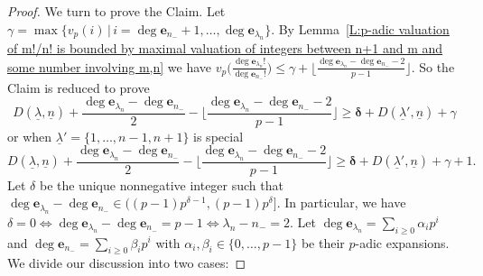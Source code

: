 \documentclass[12pt]{amsart}
\theoremstyle{definition}
\numberwithin{equation}{subsection}
\def\bfe{\mathbf{e}}
\begin{document}
\begin{proof}
We turn to prove the Claim.
Let $\gamma=\max\{v_p(i)\,|\,i=\deg \bfe_{n_-}+1,\dots, \deg \bfe_{\lambda_n} \}$. By Lemma~\ref{L:p-adic valuation of m!/n! is bounded by maximal valuation of integers between n+1 and m and some number involving m,n} we have $v_p\big(\frac{\deg \bfe_{\lambda_n}!}{\deg \bfe_{n_-}!} \big)\leq \gamma+\lfloor \frac {\deg \bfe_{\lambda_n}-\deg \bfe_{n_-}-2}{p-1} \rfloor$. So the Claim is reduced to prove
	\begin{equation}
	\label{E:lambda to lambda'}
	D(\underline \lambda, \underline n) + \frac{\deg \bfe_{\lambda_n} - \deg \bfe_{n_-}}2 - \Big\lfloor \frac{\deg \bfe_{\lambda_n}-\deg \bfe_{n_-}-2}{p-1}\Big\rfloor \geq \boldsymbol{\delta} + D(\underline \lambda', \underline n) + \gamma
	\end{equation}
    or when $\underline\lambda'=\{1,\dots, n-1,n+1\}$ is special
    \begin{equation}
	\label{E:lambda to lambda' in the special case}
	D(\underline \lambda, \underline n) + \frac{\deg \bfe_{\lambda_n} - \deg \bfe_{n_-}}2 - \Big\lfloor \frac{\deg \bfe_{\lambda_n}-\deg \bfe_{n_-}-2}{p-1}\Big\rfloor \geq \boldsymbol{\delta} + D(\underline \lambda', \underline n) + \gamma+1.
	\end{equation}
Let $\delta$ be the unique nonnegative integer such that $\deg \bfe_{\lambda_n}-\deg \bfe_{n_-}\in ((p-1)p^{\delta-1},(p-1)p^\delta]$. In particular, we have $\delta=0\Leftrightarrow \deg \bfe_{\lambda_n}-\deg \bfe_{n_-}=p-1\Leftrightarrow \lambda_n-n_-=2$. Let $\deg\bfe_{\lambda_n}=\sum\limits_{i\geq 0}\alpha_ip^i$ and $\deg \bfe_{n_-}=\sum\limits_{i\geq 0}\beta_ip^i$ with $\alpha_i,\beta_i\in \{0,\dots, p-1 \}$ be their $p$-adic expansions. We divide our discussion into two cases:


\end{proof}
\end{document}
